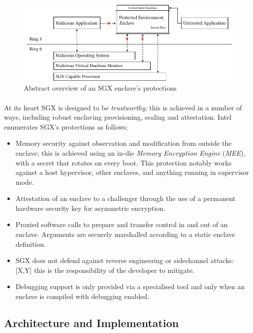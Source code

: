 \begin{figure}[]
    \centering
    \includegraphics[width=0.9\linewidth]{figures/SGX-architecture.pdf}
    \caption{Abstract overview of an SGX enclave's protections}
    \label{fig:sgx-basic}
\end{figure}

\paragraph{} At its heart SGX is designed to be \textit{trustworthy}; this is achieved in a number of ways, including robust enclaving provisioning, sealing and attestation. Intel enumerates SGX's protections as follows;

\begin{itemize}
    \item Memory security against observation and modification from outside the enclave; this is achieved using an in-die \textit{Memory Encryption Engine} (\textit{MEE}), with a secret that rotates on every boot. This protection notably works against a host hypervisor, other enclaves, and anything running in supervisor mode.
    \item Attestation of an enclave to a challenger through the use of a permanent hardware security key for asymmetric encryption.
    \item Proxied software calls to prepare and transfer control in and out of an enclave. Arguments are securely marshalled according to a static enclave definition.
    \item SGX does not defend against reverse engineering or sidechannel attacks: [X,Y] this is the responsibility of the developer to mitigate.
    \item Debugging support is only provided via a specialised tool and only when an enclave is compiled with debugging enabled.
\end{itemize}

\subsection{Architecture and Implementation}

